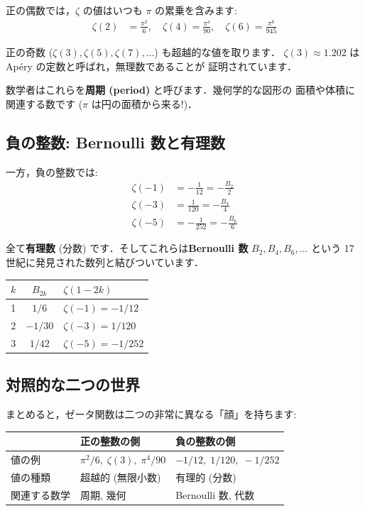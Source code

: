 \documentclass[11pt,a4paper]{article}
\begin{document}
正の偶数では，$\zeta$ の値はいつも $\pi$ の累乗を含みます:
\begin{align*}
\zeta(2) &= \frac{\pi^2}{6}, \quad
\zeta(4) = \frac{\pi^4}{90}, \quad
\zeta(6) = \frac{\pi^6}{945}
\end{align*}

正の奇数 ($\zeta(3), \zeta(5), \zeta(7), \ldots$) も超越的な値を取ります．
$\zeta(3) \approx 1.202$ は Ap\'ery の定数と呼ばれ，無理数であることが
証明されています．

数学者はこれらを\textbf{周期 (period)} と呼びます．幾何学的な図形の
面積や体積に関連する数です ($\pi$ は円の面積から来る!)．

\subsection{負の整数: Bernoulli 数と有理数}

一方，負の整数では:
\begin{align*}
\zeta(-1) &= -\frac{1}{12} = -\frac{B_2}{2}\\[4pt]
\zeta(-3) &= \frac{1}{120} = -\frac{B_4}{4}\\[4pt]
\zeta(-5) &= -\frac{1}{252} = -\frac{B_6}{6}
\end{align*}

全て\textbf{有理数} (分数) です．そしてこれらは\textbf{Bernoulli 数}
$B_2, B_4, B_6, \ldots$ という 17 世紀に発見された数列と結びついています．

\begin{center}
\begin{tabular}{ccl}
\toprule
$k$ & $B_{2k}$ & $\zeta(1-2k)$ \\
\midrule
1 & $1/6$ & $\zeta(-1) = -1/12$ \\
2 & $-1/30$ & $\zeta(-3) = 1/120$ \\
3 & $1/42$ & $\zeta(-5) = -1/252$ \\
\bottomrule
\end{tabular}
\end{center}

\subsection{対照的な二つの世界}

まとめると，ゼータ関数は二つの非常に異なる「顔」を持ちます:

\begin{center}
\begin{tabular}{lll}
\toprule
 & \textbf{正の整数の側} & \textbf{負の整数の側} \\
\midrule
値の例 & $\pi^2/6,\; \zeta(3),\; \pi^4/90$ & $-1/12,\; 1/120,\; -1/252$ \\
値の種類 & 超越的 (無限小数) & 有理的 (分数) \\
関連する数学 & 周期, 幾何 & Bernoulli 数, 代数 \\
\bottomrule
\end{tabular}
\end{center}
\end{document}
